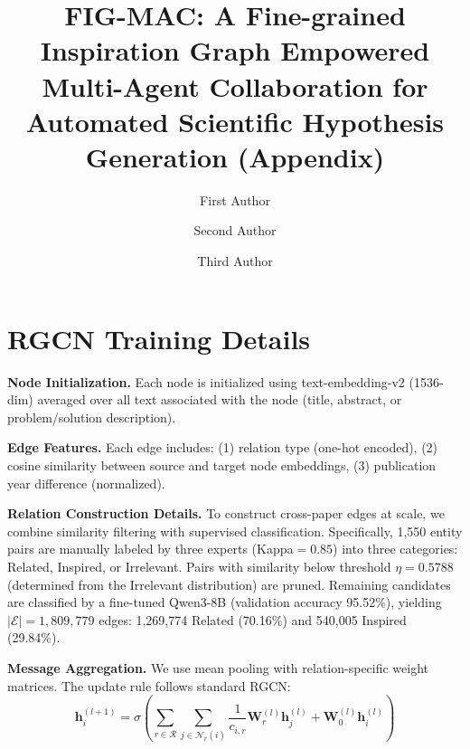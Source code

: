 \documentclass[runningheads]{llncs}
\begin{document}
\title{FIG-MAC: A Fine-grained Inspiration Graph Empowered Multi-Agent Collaboration for Automated Scientific Hypothesis Generation (Appendix)}


\author{First Author \and Second Author \and Third Author}



\maketitle

\newpage
\appendix

\section{RGCN Training Details}
\label{app:rgcn}

\textbf{Node Initialization.} Each node is initialized using text-embedding-v2 (1536-dim) averaged over all text associated with the node (title, abstract, or problem/solution description).

\textbf{Edge Features.} Each edge includes: (1) relation type (one-hot encoded), (2) cosine similarity between source and target node embeddings, (3) publication year difference (normalized).

\textbf{Relation Construction Details.} To construct cross-paper edges at scale, we combine similarity filtering with supervised classification. Specifically, 1,550 entity pairs are manually labeled by three experts (Kappa$=0.85$) into three categories: Related, Inspired, or Irrelevant. Pairs with similarity below threshold $\eta = 0.5788$ (determined from the Irrelevant distribution) are pruned. Remaining candidates are classified by a fine-tuned Qwen3-8B (validation accuracy 95.52\%), yielding $|\mathcal{E}| = 1{,}809{,}779$ edges: 1,269,774 Related (70.16\%) and 540,005 Inspired (29.84\%).


\textbf{Message Aggregation.} We use mean pooling with relation-specific weight matrices. The update rule follows standard RGCN:
\begin{equation}
\mathbf{h}_i^{(l+1)} = \sigma\left(\sum_{r\in\mathcal{R}}\sum_{j\in\mathcal{N}_r(i)}\frac{1}{c_{i,r}}\mathbf{W}_r^{(l)}\mathbf{h}_j^{(l)} + \mathbf{W}_0^{(l)}\mathbf{h}_i^{(l)}\right)
\end{equation}
\end{document}
